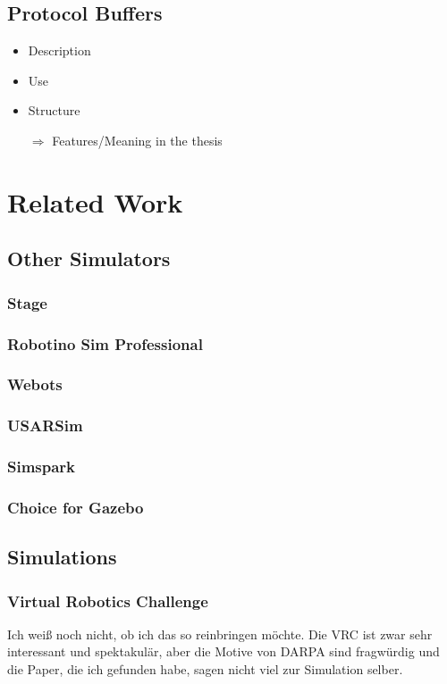 \documentclass[a4paper,11pt]{article}
\begin{document}
\subsection{Protocol Buffers}
\begin{itemize}
\item Description
\item Use
\item Structure
\item[$\Rightarrow$] Features/Meaning in the thesis
\end{itemize}

\section{Related Work}
\subsection{Other Simulators}
\subsubsection{Stage}
\subsubsection{Robotino Sim Professional}
\subsubsection{Webots}
\subsubsection{USARSim}
\subsubsection{Simspark}
\subsubsection{Choice for Gazebo}
\subsection{Simulations}
\subsubsection{Virtual Robotics Challenge}
Ich weiß noch nicht, ob ich das so reinbringen möchte. Die VRC ist zwar sehr interessant und spektakulär, aber die Motive von DARPA sind fragwürdig und die Paper, die ich gefunden habe, sagen nicht viel zur Simulation selber.
\end{document}
